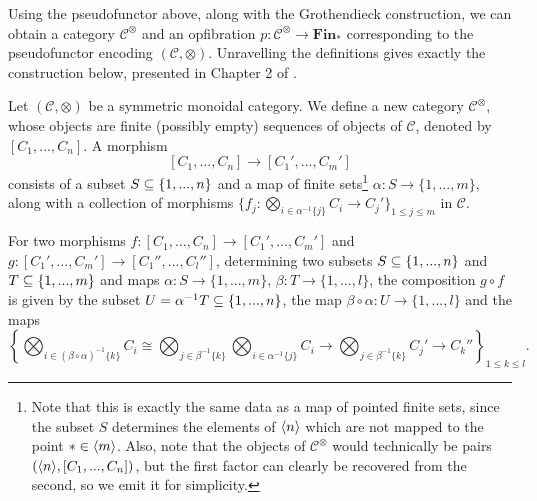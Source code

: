 \documentclass{MetricNotes2023}
\def\subq{\ensuremath\subseteq}
\begin{document}

Using the pseudofunctor above, along with the Grothendieck construction, we can obtain a category \(\mathcal{C}^\otimes\) and an opfibration \(p : \mathcal{C}^\otimes\to \textbf{Fin}_*\) corresponding to the pseudofunctor encoding \((\mathcal{C}, \otimes)\). Unravelling the definitions gives exactly the construction below, presented in Chapter 2 of \autocite{higheralgebra}. 

Let \((\mathcal{C}, \otimes)\) be a symmetric monoidal category. We define a new category \(\mathcal{C}^\otimes\), whose objects are finite (possibly empty) sequences of objects of \(\mathcal{C}\), denoted by \([C_1, ..., C_n]\). A morphism 
\[[C_1, ..., C_n]\to [C_1', ..., C_m']\]
consists of a subset \(S \subq \{1, ..., n\}\) and a map of finite sets\footnote{Note that this is exactly the same data as a map of pointed finite sets, since the subset \(S\) determines the elements of \(\langle n\rangle\) which are not mapped to the point \(*\in \langle m\rangle\). Also, note that the objects of \(\mathcal{C}^\otimes\) would technically be pairs \((\langle n\rangle,[C_1, ..., C_n])\), but the first factor can clearly be recovered from the second, so we emit it for simplicity.} \(\alpha : S \to \{1, ..., m\}\), along with a collection of morphisms \(\{f_j : \bigotimes_{i \in \alpha^{-1}\{j\}} C_i \to C_j'\}_{1 \leq j \leq m}\) in \(\mathcal{C}\). 

For two morphisms \(f : [C_1, ..., C_n]\to [C_1', ..., C_m']\) and \(g : [C_1', ..., C_m']\to[C_1'', ..., C_l'']\), determining two subsets \(S \subq \{1, ..., n\}\) and \(T \subq \{1, ..., m\}\) and maps \(\alpha : S \to \{1, ..., m\}\), \(\beta : T \to \{1, ..., l\}\), the composition \(g \circ f\) is given by the subset \(U = \alpha^{-1}T \subq \{1, ..., n\}\), the map \(\beta \circ \alpha : U \to \{1, ..., l\}\) and the maps 
\[\left\{\bigotimes_{i \in (\beta \circ \alpha)^{-1}\{k\}} C_i \cong \bigotimes_{j \in \beta^{-1}\{k\}}\bigotimes_{i \in \alpha^{-1}\{j\}}C_i \to \bigotimes_{j \in \beta^{-1}\{k\}}C_j' \to C_k''\right\}_{1 \leq k \leq l}.\] 
\end{document}
